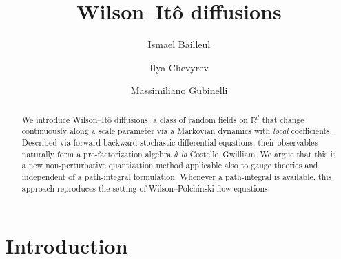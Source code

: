 \documentclass[reprint,aps]{revtex4-2}
\newcommand{\tmtextit}[1]{\textit{{{#1}}}}
\begin{document}
\title{Wilson--It{\^o} diffusions}

\author{Ismael Bailleul}

\author{Ilya Chevyrev}

\author{Massimiliano Gubinelli}


\begin{abstract}
  We introduce Wilson--It{\^o} diffusions, a class of random fields on
  $\mathbb{R}^d$ that change continuously along a scale parameter via a
  Markovian dynamics with \tmtextit{local} coefficients. Described via
  forward-backward stochastic differential equations, their observables
  naturally form a pre-factorization algebra \tmtextit{{\`a} la}
  Costello--Gwilliam. We argue that this is a new non-perturbative
  quantization method applicable also to gauge theories and independent of a
  path-integral formulation. Whenever a path-integral is available, this
  approach reproduces the setting of Wilson--Polchinski flow equations.
\end{abstract}

{\maketitle}

\section{Introduction}
\end{document}
